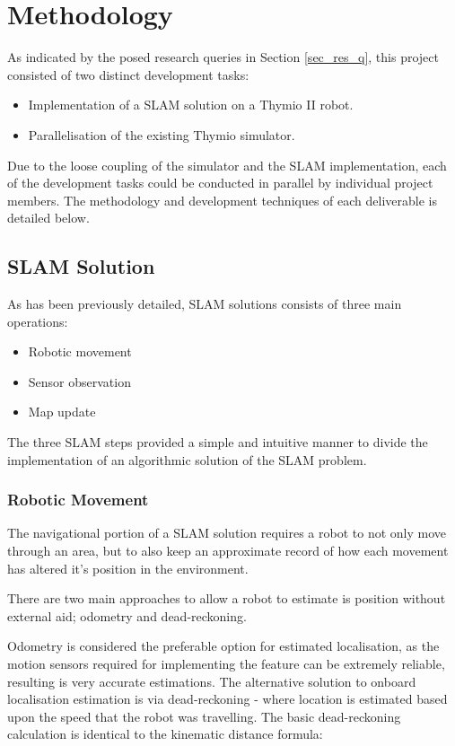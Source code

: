 \section{Methodology}
As indicated by the posed research queries in Section \ref{sec_res_q},
this project consisted of two distinct development tasks:

\begin{itemize}
\item Implementation of a SLAM solution on a Thymio II robot.
\item Parallelisation of the existing Thymio simulator.
\end{itemize}

Due to the loose coupling of the simulator and the SLAM implementation, each of
the development tasks could be conducted in parallel by individual project
members.
The methodology and development techniques of each deliverable is detailed
below.

\subsection{SLAM Solution}
As has been previously detailed, SLAM solutions consists of three main
operations:
\begin{itemize}
    \item Robotic movement
    \item Sensor observation
    \item Map update
\end{itemize}
The three SLAM steps provided a simple and intuitive manner to divide the
implementation of an algorithmic solution of the SLAM problem.

\subsubsection{Robotic Movement}
The navigational portion of a SLAM solution requires a robot to not only move
through an area, but to also keep an approximate record of how each movement
has altered it's position in the environment.

There are two main approaches to allow a robot to estimate is position
without external aid; odometry and dead-reckoning.

Odometry is considered the preferable option for estimated localisation, as
the motion sensors required for implementing the feature can be extremely
reliable, resulting is very accurate estimations.
The alternative solution to onboard localisation estimation is via
dead-reckoning - where location is estimated based upon the speed that the
robot was travelling.
The basic dead-reckoning calculation is identical to the kinematic
distance formula:

